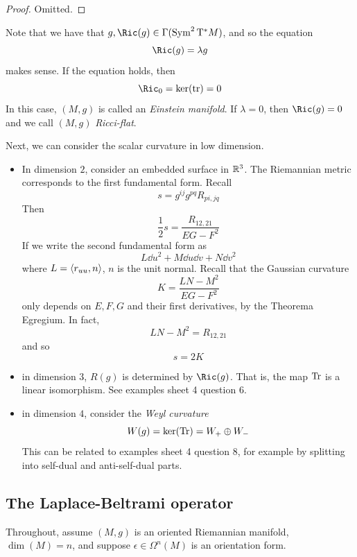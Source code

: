 \documentclass{article}
\begin{document}
\begin{proof}
    Omitted.
\end{proof}

\lec

Note that we have that \(g, \Ric(g) \in \Gamma(\Sym^2\T^* M)\), and so the equation
\[\Ric(g) = \lambda g\]
makes sense. If the equation holds, then
\[\Ric_0 = \ker(\tr) = 0\]
In this case, \((M, g)\) is called an \emph{Einstein manifold}. If \(\lambda = 0\), then \(\Ric(g) = 0\) and we call \((M, g)\) \emph{Ricci-flat}.

Next, we can consider the scalar curvature in low dimension.
\begin{itemize}
    \item In dimension \(2\), consider an embedded surface in \(\mathbb{R}^3\). The Riemannian metric corresponds to the first fundamental form. Recall
    \[s = g^{ij}g^{pq}R_{pi, jq}\]
    Then
    \[\frac{1}{2}s = \frac{R_{12, 21}}{EG - F^2}\]
    If we write the second fundamental form as
    \[L\dd u^2 + M \dd u\dd v + N\dd v^2\]
    where \(L = \left\langle r_{uu}, n \right\rangle\), \(n\) is the unit normal. Recall that the Gaussian curvature
    \[K = \frac{LN - M^2}{EG - F^2}\]
    only depends on \(E, F, G\) and their first derivatives, by the Theorema Egregium. In fact,
    \[LN - M^2 = R_{12, 21}\]
    and so
    \[s = 2K\]
    \item in dimension \(3\), \(R(g)\) is determined by \(\Ric(g)\). That is, the map \(\Tr\) is a linear isomorphism. See examples sheet 4 question 6.
    \item in dimension \(4\), consider the \emph{Weyl curvature}
    \[W(g) = \ker(\Tr) = W_+ \oplus W_-\]
    This can be related to examples sheet 4 question 8, for example by splitting into self-dual and anti-self-dual parts.
\end{itemize}

\subsection{The Laplace-Beltrami operator}

Throughout, assume \((M, g)\) is an oriented Riemannian manifold, \(\dim(M) = n\), and suppose \(\epsilon \in \Omega^n(M)\) is an orientation form.
\end{document}
